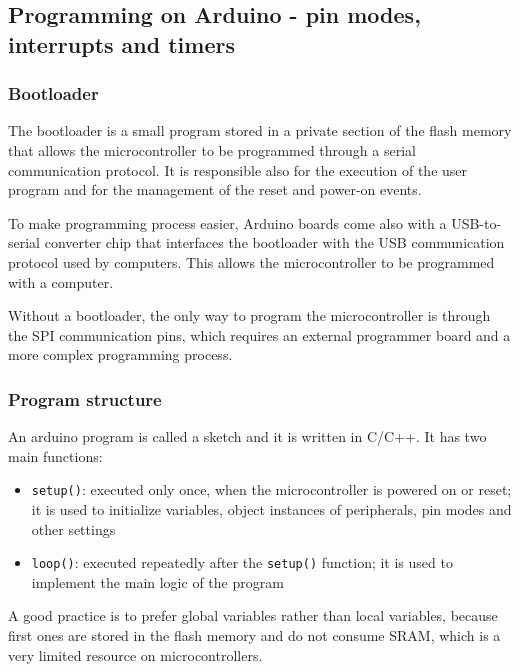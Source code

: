 \subsection{Programming on Arduino - pin modes, interrupts and timers}
\subsubsection*{Bootloader}
The bootloader is a small program stored in a private section of the flash memory that allows the microcontroller to be
programmed through a serial communication protocol. It is responsible also for the execution of the user program and for
the management of the reset and power-on events.

To make programming process easier, Arduino boards come also with a USB-to-serial converter chip that interfaces the bootloader
with the USB communication protocol used by computers. This allows the microcontroller to be programmed with a computer.

Without a bootloader, the only way to program the microcontroller is through the SPI communication pins, which requires
an external programmer board and a more complex programming process. 

\subsubsection*{Program structure}
An arduino program is called a sketch and it is written in C/C++. It has two main functions:
\begin{itemize}
	\item \texttt{setup()}: executed only once, when the microcontroller is powered on or reset; it is used to initialize
	variables, object instances of peripherals, pin modes and other settings
	\item \texttt{loop()}: executed repeatedly after the \texttt{setup()} function; it is used to implement the main logic
	of the program
\end{itemize}

\noindent
A good practice is to prefer global variables rather than local variables, because first ones are stored in the flash memory and
do not consume SRAM, which is a very limited resource on microcontrollers.


